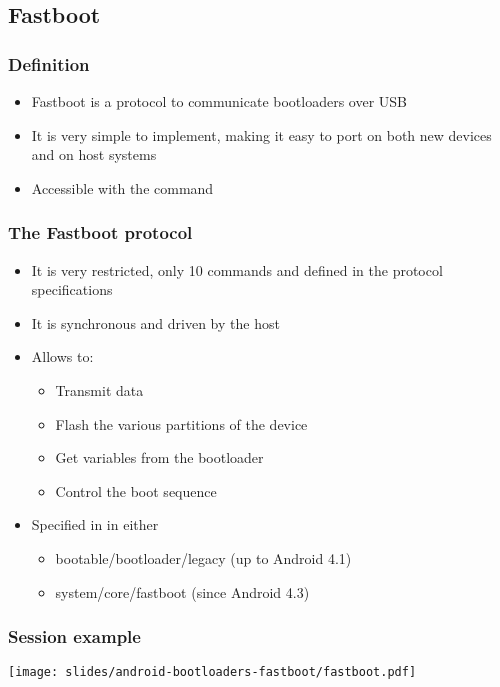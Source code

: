 \subsection{Fastboot}
\begin{frame}
  \frametitle{Definition}
  \begin{itemize}
  \item Fastboot is a protocol to communicate bootloaders over
    USB
  \item It is very simple to implement, making it easy to port on
    both new devices and on host systems
  \item Accessible with the  command
  \end{itemize}
\end{frame}

\begin{frame}
  \frametitle{The Fastboot protocol}
  \begin{itemize}
  \item It is very restricted, only 10 commands and defined in the
    protocol specifications
  \item It is synchronous and driven by the host
  \item Allows to:
    \begin{itemize}
      \item Transmit data
      \item Flash the various partitions of the device
      \item Get variables from the bootloader
      \item Control the boot sequence
    \end{itemize}
  \item Specified in  in either
    \begin{itemize}
      \item bootable/bootloader/legacy (up to Android 4.1)
      \item system/core/fastboot (since Android 4.3)
    \end{itemize}
  \end{itemize}
\end{frame}

\begin{frame}
  \frametitle{Session example}
  \begin{center}
    \texttt{[image: slides/android-bootloaders-fastboot/fastboot.pdf]}
  \end{center}
\end{frame}

